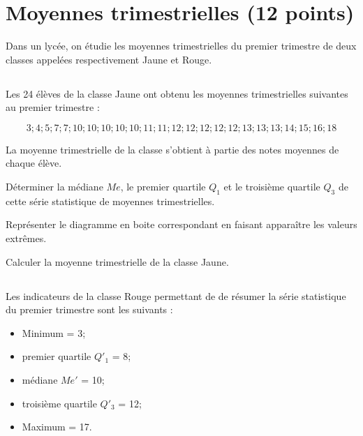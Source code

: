 \section{Moyennes trimestrielles (12 points)}

Dans un lycée, on étudie les moyennes trimestrielles du premier trimestre de deux classes appelées respectivement Jaune et Rouge.

\subsection{}
Les 24 élèves de la classe Jaune ont obtenu les moyennes trimestrielles suivantes au premier trimestre :

\begin{equation*}
3 ; 4 ; 5 ; 7 ; 7 ; 10 ; 10 ; 10 ; 10 ; 10 ; 11 ;  11 ; 12 ; 12 ; 12 ; 12 ; 12 ; 13 ; 13 ; 13 ; 14 ; 15 ; 16 ; 18
\end{equation*}

La moyenne trimestrielle de la classe s'obtient à partie des notes moyennes de chaque élève.

\begin{questions}
	\question[2] Déterminer la médiane $Me$, le premier quartile $Q_1$ et le troisième quartile $Q_3$ de cette série statistique de moyennes trimestrielles.
	
	\question[1\half] Représenter le diagramme en boite correspondant en faisant apparaître les valeurs extrêmes.
	
	\question[1] Calculer la moyenne trimestrielle de la classe Jaune.
\end{questions}

\subsection{}

Les indicateurs de la classe Rouge permettant de de résumer la série statistique du premier trimestre sont les suivants :

\begin{itemize}
	\item Minimum = 3;
	\item premier quartile $Q'_1$ = 8;
	\item médiane $Me'$ = 10;
	\item troisième quartile $Q'_3$ = 12;
	\item Maximum = 17.
\end{itemize}

